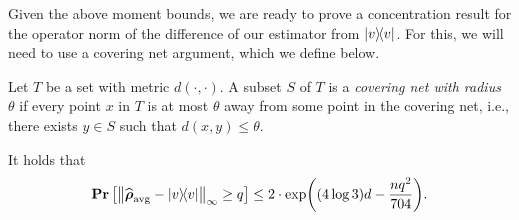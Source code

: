 \documentclass{article}
\begin{document}
Given the above moment bounds, we are ready to prove a concentration result for the operator norm of the difference of our estimator from $\ketbra{v}$. For this, we will need to use a covering net argument, which we define below.

\begin{definition}
    Let $T$ be a set with metric $d(\cdot, \cdot)$. A subset $S$ of $T$ is a \emph{covering net with radius $\theta$} if every point $x$ in $T$ is at most $\theta$ away from some point in the covering net, i.e., there exists $y \in S$ such that $d(x, y) \leq \theta$.
\end{definition}

\begin{lemma}
    \label{lem:concentration-in-op-norm-gkkt}
    It holds that
    \begin{equation*}
        \mathop{\bf Pr\/}\big[\norm{\widehat{\boldsymbol{\rho}}_{\mathrm{avg}} - \ketbra{v}}_{\infty} \geq q\big]
        \leq 2 \cdot \exp((4\log 3)d-\frac{nq^2}{704}).
    \end{equation*}
\end{lemma}
\end{document}
